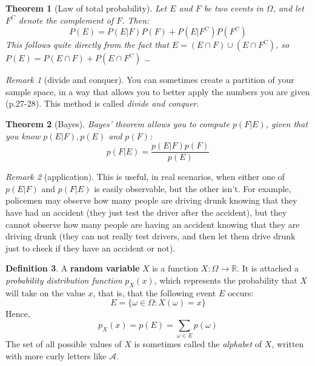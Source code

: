 \documentclass{report}
\theoremstyle{plain}
\newtheorem{thm}{Theorem}
\theoremstyle{definition}
\newtheorem{defn}[thm]{Definition}
\theoremstyle{remark}
\newtheorem*{remark}{Remark}
\begin{document}
\begin{thm}[Law of total probability]
Let $E$ and $F$ be two events in $\Omega$, and let $F^C$ denote the complement of $F$. Then:
\begin{equation}
	P(E) = P(E|F)P(F) + P(E|F^C)P(F^C)
\end{equation}
This follows quite directly from the fact that $E = (E \cap F) \cup (E \cap F^C)$, so $P(E) = P(E \cap F) + P(E \cap F^C)$ \dots 
\end{thm}

\begin{remark}[divide and conquer] You can sometimes create a partition of your sample space, in a way that allows you to better apply the numbers you are given (p.27-28). This method is called \emph{divide and conquer}.
\end{remark}

\begin{thm}[Bayes]
Bayes' theorem allows you to compute $p(F|E)$, given that you know $p(E|F), p(E)$ and $p(F)$:
\begin{equation}
	p(F|E) = \dfrac{p(E|F)p(F)}{p(E)}
\end{equation}
\end{thm}

\begin{remark}[application] This is useful, in real scenarios, when either one of $p(E|F)$ and $p(F|E)$ is easily observable, but the other isn't. For example, policemen may observe how many people are driving drunk knowing that they have had an accident (they just test the driver after the accident), but they cannot observe how many people are having an accident knowing that they are driving drunk (they can not really test drivers, and then let them drive drunk just to check if they have an accident or not).
\end{remark}

\begin{defn}
A \textbf{random variable} $X$ is a function $X: \Omega \to \mathbb{R}$. It is attached a \emph{probability distribution function} $p_X(x)$, which represents the probability that $X$ will take on the value $x$, that is, that the following event $E$ occurs:
\begin{equation}
	E = \{\omega \in \Omega : X(\omega) = x\}
\end{equation}
Hence,
\begin{equation}
	p_X(x) = p(E) = \sum_{\omega \in E} p(\omega)
\end{equation}
The set of all possible values of $X$ is sometimes called the \emph{alphabet} of $X$, written with more curly letters like $\mathcal A$.
\end{defn}
\end{document}
